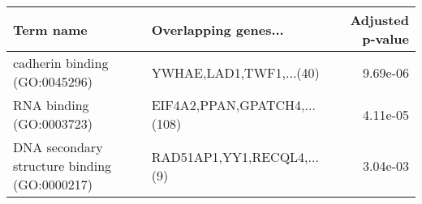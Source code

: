 \begin{tabular}{llr}
\toprule
                                   Term name &         Overlapping genes... &  Adjusted p-value \\
\midrule
               cadherin binding (GO:0045296) &      YWHAE,LAD1,TWF1,...(40) &          9.69e-06 \\
                    RNA binding (GO:0003723) & EIF4A2,PPAN,GPATCH4,...(108) &          4.11e-05 \\
DNA secondary structure binding (GO:0000217) &   RAD51AP1,YY1,RECQL4,...(9) &          3.04e-03 \\
\bottomrule
\end{tabular}
